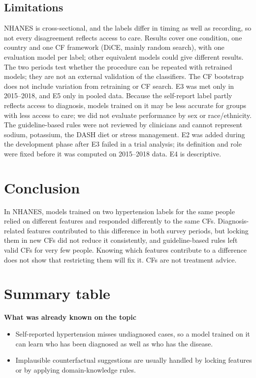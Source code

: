 \documentclass[preprint,review,12pt,times]{elsarticle}
\providecommand{\tightlist}{\setlength{\itemsep}{0pt}\setlength{\parskip}{0pt}}
\begin{document}
\subsection{Limitations}

NHANES is cross-sectional, and the labels differ in timing as well as
recording, so not every disagreement reflects access to care. Results
cover one condition, one country and one CF framework (DiCE, mainly
random search), with one evaluation model per label; other equivalent
models could give different results. The two periods test whether the
procedure can be repeated with retrained models; they are not an
external validation of the classifiers. The CF bootstrap does not
include variation from retraining or CF search. E3 was met only in
2015--2018, and E5 only in pooled data. Because the self-report label
partly reflects access to diagnosis, models trained on it may be less
accurate for groups with less access to care; we did not evaluate
performance by sex or race/ethnicity. The guideline-based rules were not
reviewed by clinicians and cannot represent sodium, potassium, the DASH
diet or stress management. E2 was added during the development phase
after E3 failed in a trial analysis; its definition and role were fixed
before it was computed on 2015--2018 data. E4 is descriptive.

\section{Conclusion}

In NHANES, models trained on two hypertension labels for the same people
relied on different features and responded differently to the same CFs.
Diagnosis-related features contributed to this difference in both survey
periods, but locking them in new CFs did not reduce it consistently, and
guideline-based rules left valid CFs for very few people. Knowing which
features contribute to a difference does not show that restricting them
will fix it. CFs are not treatment advice.


\section*{Summary table}
\textbf{What was already known on the topic}

\begin{itemize}
\tightlist
\item
  Self-reported hypertension misses undiagnosed cases, so a model
  trained on it can learn who has been diagnosed as well as who has the
  disease.
\item
  Implausible counterfactual suggestions are usually handled by locking
  features or by applying domain-knowledge rules.
\end{itemize}
\end{document}
